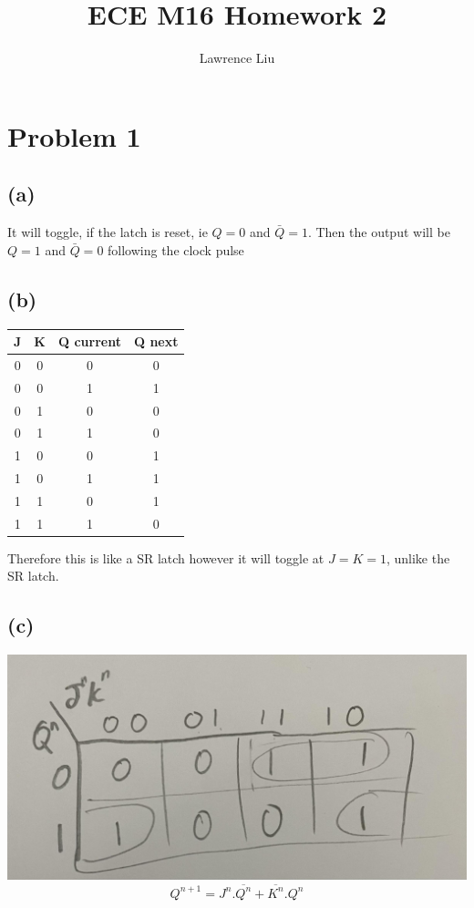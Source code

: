 \documentclass[12pt]{article}
\title{ECE M16 Homework 2}
\author{Lawrence Liu}
\begin{document}
\maketitle
\section*{Problem 1}
\subsection*{(a)}
It will toggle, if the latch is reset, ie $Q=0$ and $\bar{Q}=1$. Then the output will be $Q=1$ and $\bar{Q}=0$ following the clock pulse
\subsection*{(b)}
\begin{center}
    \begin{tabular}{|c|c|c||c|}
        J & K & Q current & Q next \\
        \hline
        0 & 0 & 0 & 0 \\
        \hline
        0 & 0 & 1 & 1 \\
        \hline
        0 & 1 & 0 & 0 \\
        \hline
        0 & 1 & 1 & 0 \\
        \hline
        1 & 0 & 0 & 1 \\
        \hline
        1 & 0 & 1 & 1 \\
        \hline
        1 & 1 & 0 & 1 \\
        \hline
        1 & 1 & 1 & 0 \\
        \hline
    \end{tabular}
\end{center}
Therefore this is like a SR latch however it will toggle at $J=K=1$, unlike the SR latch.
\subsection*{(c)}
\includegraphics[scale=0.15]{Problem1.jpg}
$$Q^{n+1}=J^{n}.\overline{Q^n}+\overline{K^n}.Q^n$$
\end{document}
